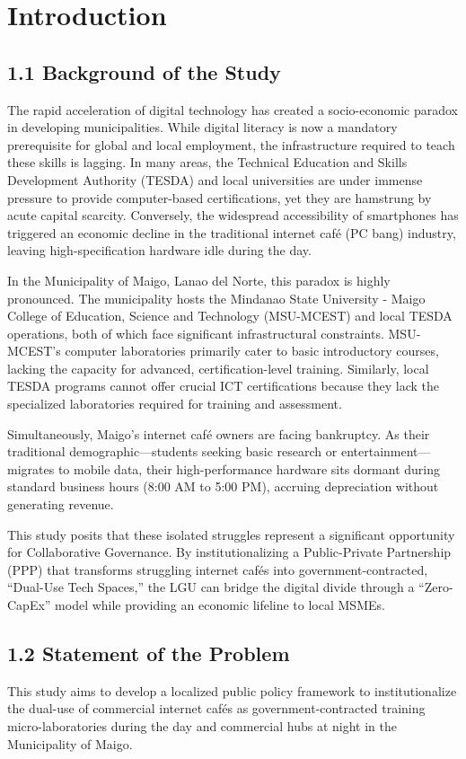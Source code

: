 \section{Introduction}

\subsection*{1.1 Background of the Study}
The rapid acceleration of digital technology has created a socio-economic paradox in developing municipalities. While digital literacy is now a mandatory prerequisite for global and local employment, the infrastructure required to teach these skills is lagging. In many areas, the Technical Education and Skills Development Authority (TESDA) and local universities are under immense pressure to provide computer-based certifications, yet they are hamstrung by acute capital scarcity. Conversely, the widespread accessibility of smartphones has triggered an economic decline in the traditional internet café (PC bang) industry, leaving high-specification hardware idle during the day.

In the Municipality of Maigo, Lanao del Norte, this paradox is highly pronounced. The municipality hosts the Mindanao State University - Maigo College of Education, Science and Technology (MSU-MCEST) and local TESDA operations, both of which face significant infrastructural constraints. MSU-MCEST’s computer laboratories primarily cater to basic introductory courses, lacking the capacity for advanced, certification-level training. Similarly, local TESDA programs cannot offer crucial ICT certifications because they lack the specialized laboratories required for training and assessment.

Simultaneously, Maigo’s internet café owners are facing bankruptcy. As their traditional demographic—students seeking basic research or entertainment—migrates to mobile data, their high-performance hardware sits dormant during standard business hours (8:00 AM to 5:00 PM), accruing depreciation without generating revenue.

This study posits that these isolated struggles represent a significant opportunity for Collaborative Governance. By institutionalizing a Public-Private Partnership (PPP) that transforms struggling internet cafés into government-contracted, ``Dual-Use Tech Spaces,'' the LGU can bridge the digital divide through a ``Zero-CapEx'' model while providing an economic lifeline to local MSMEs.

\subsection*{1.2 Statement of the Problem}
This study aims to develop a localized public policy framework to institutionalize the dual-use of commercial internet cafés as government-contracted training micro-laboratories during the day and commercial hubs at night in the Municipality of Maigo.

